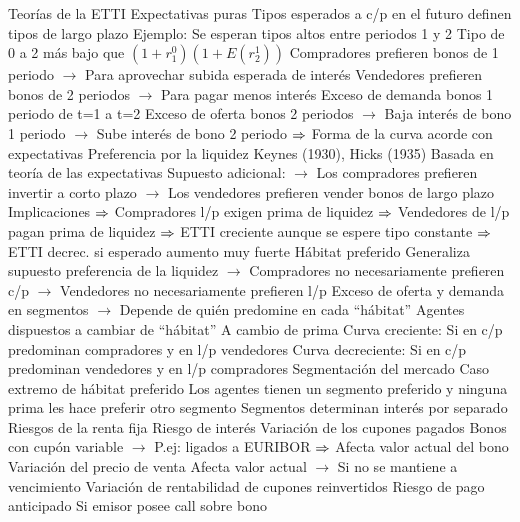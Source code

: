 \documentclass{nuevotema}
\begin{document}
\begin{esquemal}
		\2 Teorías de la ETTI
			\3 Expectativas puras
				\4 Tipos esperados a c/p en el futuro
				\4[] definen tipos de largo plazo
				\4 Ejemplo:
				\4[] Se esperan tipos altos entre periodos 1 y 2
				\4[] Tipo de 0 a 2 más bajo que $\left( 1+r^0_1 \right) \left( 1+E \left( r^1_2\right) \right)$
				\4[] Compradores prefieren bonos de 1 periodo
				\4[] $\to$ Para aprovechar subida esperada de interés
				\4[] Vendedores prefieren bonos de 2 periodos
				\4[] $\to$ Para pagar menos interés
				\4[] Exceso de demanda bonos 1 periodo de t=1 a t=2
				\4[] Exceso de oferta bonos 2 periodos
				\4[] $\to$ Baja interés de bono 1 periodo
				\4[] $\to$ Sube interés de bono 2 periodo
				\4[] $\Rightarrow$ Forma de la curva acorde con expectativas
			\3 Preferencia por la liquidez
				\4 Keynes (1930), Hicks (1935)
				\4 Basada en teoría de las expectativas
				\4 Supuesto adicional:
				\4[] $\to$ Los compradores prefieren invertir a corto plazo
				\4[] $\to$ Los vendedores prefieren vender bonos de largo plazo
				\4 Implicaciones
				\4[] $\Rightarrow$ Compradores l/p exigen prima de liquidez
				\4[] $\Rightarrow$ Vendedores de l/p pagan prima de liquidez
				\4[] $\Rightarrow$ ETTI creciente aunque se espere tipo constante
				\4[] $\Rightarrow$ ETTI decrec. si esperado aumento muy fuerte
			\3 Hábitat preferido
				\4 Generaliza supuesto preferencia de la liquidez
				\4[] $\to$ Compradores no necesariamente prefieren c/p
				\4[] $\to$ Vendedores no necesariamente prefieren l/p
				\4 Exceso de oferta y demanda en segmentos
				\4[] $\to$ Depende de quién predomine en cada ``hábitat''
				\4 Agentes dispuestos a cambiar de ``hábitat''
				\4[] A cambio de prima
				\4[$\Rightarrow$] Curva creciente:
				\4[] Si en c/p predominan compradores y en l/p vendedores
				\4[$\Rightarrow$] Curva decreciente:
				\4[] Si en c/p predominan vendedores y en l/p compradores
			\3 Segmentación del mercado
				\4 Caso extremo de hábitat preferido
				\4[] Los agentes tienen un segmento preferido
				\4[] y ninguna prima les hace preferir otro segmento
				\4[$\Rightarrow$] Segmentos determinan interés por separado
	\1 
		\2 Riesgos de la renta fija
			\3 Riesgo de interés
				\4 Variación de los cupones pagados
				\4[] Bonos con cupón variable
				\4[] $\to$ P.ej: ligados a EURIBOR
				\4[] $\Rightarrow$ Afecta valor actual del bono
				\4 Variación del precio de venta
				\4[] Afecta valor actual
				\4[] $\to$ Si no se mantiene a vencimiento
				\4 Variación de rentabilidad de cupones reinvertidos
			\3 Riesgo de pago anticipado
				\4 Si emisor posee call sobre bono

\end{esquemal}
\end{document}

